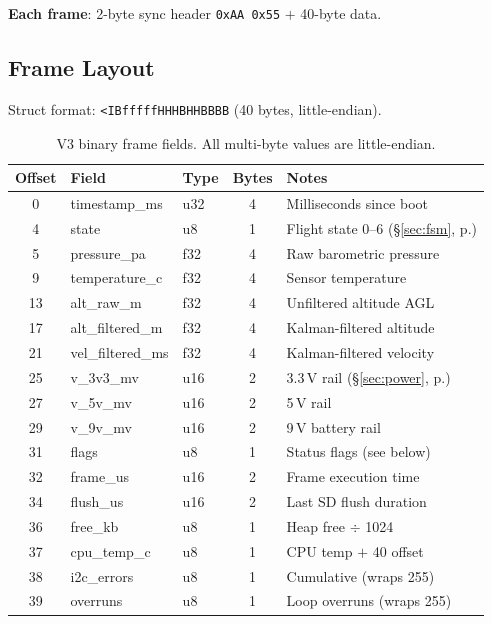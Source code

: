 \documentclass[11pt, a4paper, twoside]{article}
\newcommand{\xref}[1]{(\S\ref{#1}, p.\pageref{#1})}
\begin{document}
\textbf{Each frame}: 2-byte sync header \texttt{0xAA\,0x55} $+$ 40-byte data.

\subsection{Frame Layout}
\label{sec:frame-layout}

Struct format: \texttt{<IBfffffHHHBHHBBBB} (40 bytes, little-endian).

\begin{table}[ht]
\centering
\small
\caption{V3 binary frame fields. All multi-byte values are little-endian.}
\label{tab:frame-v3}
\begin{tabular}{c l l c l}
\toprule
\textbf{Offset} & \textbf{Field} & \textbf{Type} & \textbf{Bytes} & \textbf{Notes} \\
\midrule
0 & timestamp\_ms & u32 & 4 & Milliseconds since boot \\
4 & state & u8 & 1 & Flight state 0--6 \xref{sec:fsm} \\
5 & pressure\_pa & f32 & 4 & Raw barometric pressure \\
9 & temperature\_c & f32 & 4 & Sensor temperature \\
13 & alt\_raw\_m & f32 & 4 & Unfiltered altitude AGL \\
17 & alt\_filtered\_m & f32 & 4 & Kalman-filtered altitude \\
21 & vel\_filtered\_ms & f32 & 4 & Kalman-filtered velocity \\
25 & v\_3v3\_mv & u16 & 2 & 3.3\,V rail \xref{sec:power} \\
27 & v\_5v\_mv & u16 & 2 & 5\,V rail \\
29 & v\_9v\_mv & u16 & 2 & 9\,V battery rail \\
31 & flags & u8 & 1 & Status flags (see below) \\
32 & frame\_us & u16 & 2 & Frame execution time \\
34 & flush\_us & u16 & 2 & Last SD flush duration \\
36 & free\_kb & u8 & 1 & Heap free $\div$ 1024 \\
37 & cpu\_temp\_c & u8 & 1 & CPU temp $+$ 40 offset \\
38 & i2c\_errors & u8 & 1 & Cumulative (wraps 255) \\
39 & overruns & u8 & 1 & Loop overruns (wraps 255) \\
\bottomrule
\end{tabular}
\end{table}
\end{document}
